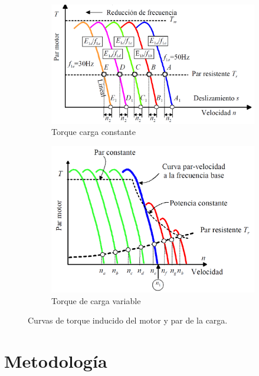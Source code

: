  
 \begin{figure}
 	\centering
 	\begin{subfigure}[b]{0.49\textwidth}
 		\centering
 		\includegraphics[width=\textwidth]{fig/TorqueConstante}
 		\caption{Torque carga constante}
 		\label{fig:torqueconstante}
 	\end{subfigure}
 	\hfill
 	\begin{subfigure}[b]{0.49\textwidth}
 		\centering
 		\includegraphics[width=\textwidth]{fig/TorqueVariable}
 		\caption{Torque de carga variable}
 		\label{fig:torquevariable}
 	\end{subfigure}
 	\caption{Curvas de torque inducido del motor y par de la carga. \cite{Mora08}}
 \end{figure}
 
 
 
\section{Metodología}

